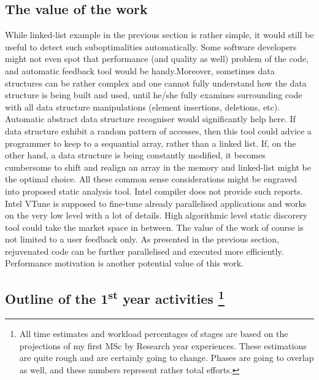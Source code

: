 \documentclass[12pt, a4paper]{article}
\begin{document}
\subsection*{\centering The value of the work}
\qquad While linked-list example in the previous section is rather simple, it would still be useful to detect such suboptimalities automatically. Some software developers might not even spot that performance (and quality as well) problem of the code, and automatic feedback tool would be handy.\newline \null\qquad Moreover, sometimes data structures can be rather complex and one cannot fully understand how the data structure is being built and used, until he/she fully examines surrounding code with all data structure manipulations (element insertions, deletions, etc). Automatic abstract data structure recogniser would significantly help here. If data structure exhibit a random pattern of accesses, then this tool could advice a programmer to keep to a sequantial array, rather than a linked list. If, on the other hand, a data structure is being constantly modified, it becomes cumbersome to shift and realign an array in the memory and linked-list might be the optimal choice.\newline
\null\qquad All these common sense considerations might be engraved into proposed static analysis tool. Intel compiler does not provide such reports. Intel VTune is supposed to fine-tune already parallelised applications and works on the very low level with a lot of details. High algorithmic level static discorery tool could take the market space in between.\newline
\null\qquad The value of the work of course is not limited to a user feedback only. As presented in the previous section, rejuvenated code can be further parallelised and executed more efficiently. Performance motivation is another potential value of this work.

\subsection*{\centering Outline of the 1\textsuperscript{st} year activities \footnote{All time estimates and workload percentages of stages are based on the projections of my first MSc by Research year experiences. These estimations are quite rough and are certainly going to change. Phases are going to overlap as well, and these numbers represent rather total efforts.}}
\end{document}
